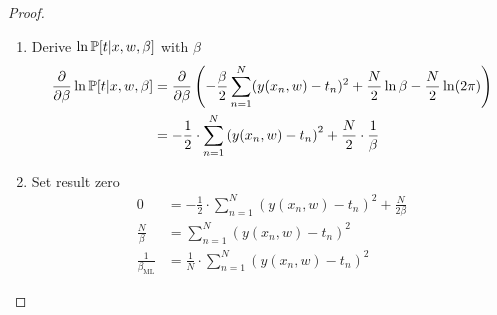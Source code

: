 \begin{proof}
\begin{enumerate}
  \item Derive $\ln{\mathbb P[t | x,w,\beta]}$ with $\beta$
    \begin{align*}
      \frac{\partial}{\partial \beta} \ln{\mathbb P[t | x,w,\beta]}
      &= \frac{\partial}{\partial \beta} \left(-\frac{\beta}{2} \sum_{n=1}^N (y(x_n,w) - t_n)^2 + \frac{N}{2} \ln\beta - \frac{N}{2} \ln(2\pi)\right) \\
      &= -\frac12 \cdot \sum_{n=1}^N \left(y(x_n,w) - t_n\right)^2 + \frac{N}{2} \cdot \frac1\beta
    \end{align*}
  \item Set result zero
    \begin{align*}
      0 &= -\frac{1}{2} \cdot \sum_{n=1}^N \left(y(x_n,w) - t_n\right)^2 + \frac{N}{2\beta} \\
      \frac{N}{\beta} &= \sum_{n=1}^N \left(y(x_n,w) - t_n\right)^2 \\
      \frac{1}{\beta_{\text{ML}}} &= \frac{1}{N} \cdot \sum_{n=1}^N (y(x_n,w) - t_n)^2
    \end{align*}
\end{enumerate}
\end{proof}


